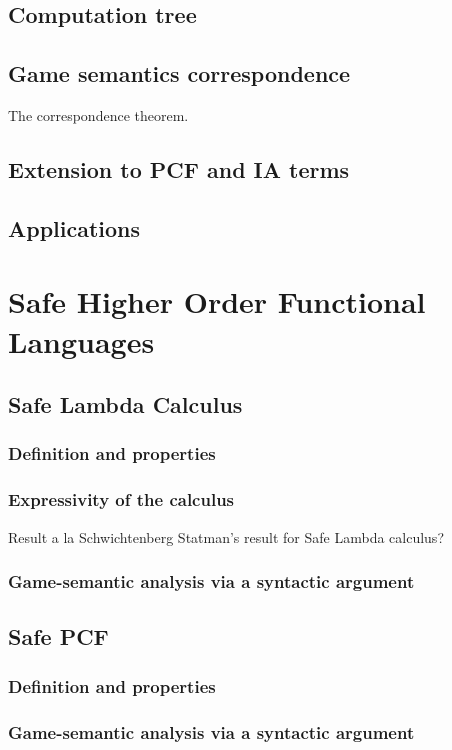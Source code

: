     \section{Computation tree}
    \section{Game semantics correspondence}
    The correspondence theorem.
    \section{Extension to PCF and IA terms}
    \section{Applications}



\chapter{Safe Higher Order Functional Languages}

    \section{Safe Lambda Calculus}
        \subsection{Definition and properties}
        \subsection{Expressivity of the calculus}
        Result a la Schwichtenberg \cite{citeulike:622637}
        Statman's result for Safe Lambda calculus?

        \subsection{Game-semantic analysis via a syntactic argument}
    \section{Safe PCF}
        \subsection{Definition and properties}
        \subsection{Game-semantic analysis via a syntactic argument}

